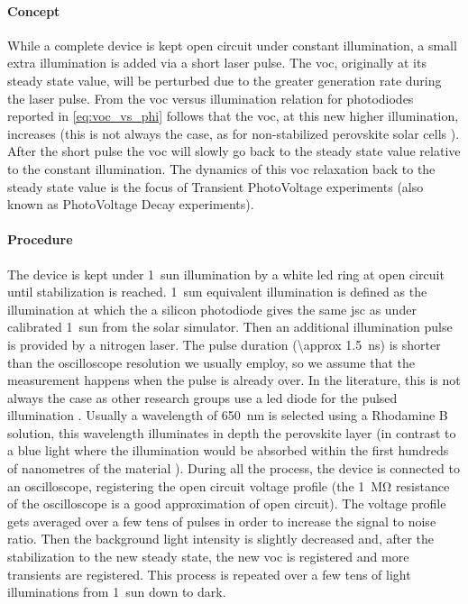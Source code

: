 	\paragraph{Concept} While a complete device is kept open circuit under constant illumination, a small extra illumination is added via a short laser pulse.
	The \gls{voc}, originally at its steady state value, will be perturbed due to the greater generation rate during the laser pulse.
	From the \gls{voc} versus illumination relation for photodiodes reported in \cref{eq:voc_vs_phi} follows that the \gls{voc}, at this new higher illumination, increases (this is not always the case, as for non-stabilized perovskite solar cells \cite{Calado2016}).
	After the short pulse the \gls{voc} will slowly go back to the steady state value relative to the constant illumination.
	The dynamics of this \gls{voc} relaxation back to the steady state value is the focus of Transient PhotoVoltage experiments \cite{ORegan2004,ORegan2005,ORegan2006} (also known as PhotoVoltage Decay experiments). 
	
	\paragraph{Procedure} The device is kept under 1~sun illumination by a white \gls{led} ring at open circuit until stabilization is reached.
	1~sun equivalent illumination is defined as the illumination at which the a silicon photodiode gives the same \gls{jsc} as under calibrated 1~sun from the solar simulator.
	Then an additional illumination pulse is provided by a nitrogen laser.
	The pulse duration (\SI{\approx 1.5}{\ns}) is shorter than the oscilloscope resolution we usually employ, so we assume that the measurement happens when the pulse is already over.
	In the literature, this is not always the case as other research groups use a \gls{led} diode for the pulsed illumination \cite{Calado2016}.
	Usually a wavelength of \SI{650}{\nm} is selected using a Rhodamine B solution\cite{RadiantDyesLaser}, this wavelength illuminates in depth the perovskite layer (in contrast to a blue light where the illumination would be absorbed within the first hundreds of nanometres of the material \cite{Bi2016}).
	During all the process, the device is connected to an oscilloscope, registering the open circuit voltage profile (the \SI{1}{\Mohm} resistance of the oscilloscope is a good approximation of open circuit). %
	The voltage profile gets averaged over a few tens of pulses in order to increase the signal to noise ratio.
	Then the background light intensity is slightly decreased and, after the stabilization to the new steady state, the new  \gls{voc} is registered and more transients are registered.
	This process is repeated over a few tens of light illuminations from 1~sun down to dark.
	
